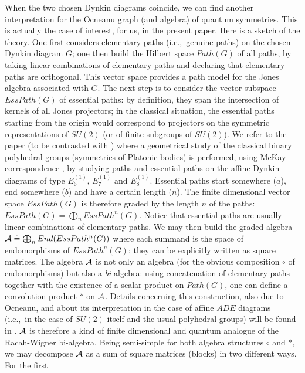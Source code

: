 \documentclass[a4paper,11pt]{article}
\def\ie{{\rm i.e.,\/}\ }
\begin{document}
When the two chosen Dynkin diagrams coincide, we can find
another interpretation for the Ocneanu graph (and algebra)
of quantum symmetries. This is actually the case of interest, for us, in
the present paper. Here is a sketch of the theory.
One first considers elementary paths (\ie genuine
paths) on the chosen Dynkin diagram $G$; one then build the
Hilbert space $Path(G)$ of all paths, by taking linear
combinations of elementary paths and declaring that elementary paths
are orthogonal. This vector space provides a path model for the Jones
algebra associated with $G$. The next step is to consider the vector subspace
$EssPath(G)$ of essential paths: by definition, they span the
intersection of kernels of all Jones projectors; in the classical
situation, the essential paths starting from the origin
would correspond to projectors on the symmetric
representations of
$SU(2)$ (or of finite subgroups of $SU(2)$). We refer to the paper
\cite{Coque:Karpacz} (to be contrasted with \cite{Coque:qtetra}) where a
geometrical study of the classical binary polyhedral groups \cite{Klein}
(symmetries of Platonic
bodies) is performed, using McKay correspondence \cite{McKay}, by
studying paths and essential paths on the
affine Dynkin diagrams of type $E_{6}^{(1)}$, $E_{7}^{(1)}$ and
$E_{8}^{(1)}$.
Essential paths start somewhere ($a$), end somewhere ($b$) and have a
certain length ($n$).
The finite dimensional vector space $EssPath(G)$ is therefore graded by
the length $n$ of the paths: $EssPath(G) =
\bigoplus_{n} EssPath^{n}(G)$. Notice that essential paths are usually
linear combinations of elementary paths. We may then build the graded
algebra ${\cal A} \doteq \bigoplus_{n} End(EssPath^{n}(G))$ where
each summand is the space of endomorphisms of $EssPath^{n}(G)$;
they can be explicitly written as  square matrices.
The algebra ${\cal A}$ is not only an algebra (for the obvious
composition $\circ$ of endomorphisms) but also a {\sl bi}-algebra:
using concatenation of elementary paths together with the existence 
of a scalar product on $Path(G)$,  one can define
a convolution product $\ast$ on ${\cal A}$.
Details concerning this construction, also due to Ocneanu, and about
its interpretation in
the case of affine $ADE$ diagrams (\ie in the case of $SU(2)$ itself
and the usual polyhedral groups) will be found in \cite{CoGaTr:triangles}.
${\cal A}$ is therefore a kind of finite dimensional and quantum
analogue of the
Racah-Wigner bi-algebra. Being semi-simple for both algebra
structures $\circ$ and $\ast$, we may decompose ${\cal A}$ as
a sum of square matrices (blocks) in two different ways. For the first
\end{document}
